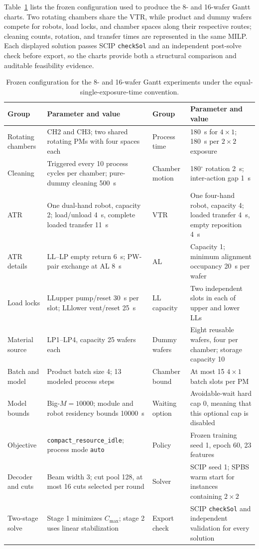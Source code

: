 \documentclass[final,5p,times,twocolumn]{elsarticle}
\begin{document}
Table~\ref{tab:gantt-config-en} lists the frozen configuration used to produce the 8- and 16-wafer Gantt charts. Two rotating chambers share the VTR, while product and dummy wafers compete for robots, load locks, and chamber spaces along their respective routes; cleaning counts, rotation, and transfer times are represented in the same MILP. Each displayed solution passes SCIP \texttt{checkSol} and an independent post-solve check before export, so the charts provide both a structural comparison and auditable feasibility evidence.

\begin{table}[!htbp]
\centering
\scriptsize
\caption{Frozen configuration for the 8- and 16-wafer Gantt experiments under the equal-single-exposure-time convention.}
\label{tab:gantt-config-en}
\begin{tabular}{p{} p{} p{} p{}}
\toprule
Group & Parameter and value & Group & Parameter and value\\
\midrule
Rotating chambers & CH2 and CH3; two shared rotating PMs with four spaces each & Process time & 180~s for $4\times1$; 180~s per $2\times2$ exposure\\
Cleaning & Triggered every 10 process cycles per chamber; pure-dummy cleaning 500~s & Chamber motion & 180$^\circ$ rotation 2~s; inter-action gap 1~s\\
ATR & One dual-hand robot, capacity 2; load/unload 4~s, complete loaded transfer 11~s & VTR & One four-hand robot, capacity 4; loaded transfer 4~s, empty reposition 4~s\\
ATR details & LL--LP empty return 6~s; PW-pair exchange at AL 8~s & AL & Capacity 1; minimum alignment occupancy 20~s per wafer\\
Load locks & LLupper pump/reset 30~s per slot; LLlower vent/reset 25~s & LL capacity & Two independent slots in each of upper and lower LLs\\
Material source & LP1--LP4, capacity 25 wafers each & Dummy wafers & Eight reusable wafers, four per chamber; storage capacity 10\\
Batch and model & Product batch size 4; 13 modeled process steps & Chamber bound & At most 15 $4\times1$ batch slots per PM\\
Model bounds & Big-$M=10000$; module and robot residency bounds 10000~s & Waiting option & Avoidable-wait hard cap 0, meaning that this optional cap is disabled\\
Objective & \texttt{compact\_resource\_idle}; process mode \texttt{auto} & Policy & Frozen training seed 1, epoch 60, 23 features\\
Decoder and cuts & Beam width 3; cut pool 128, at most 16 cuts selected per round & Solver & SCIP seed 1; SPBS warm start for instances containing $2\times2$\\
Two-stage solve & Stage 1 minimizes $C_{\max}$; stage 2 uses linear stabilization & Export check & SCIP \texttt{checkSol} and independent validation for every solution\\
\bottomrule
\end{tabular}
\end{table}
\end{document}
